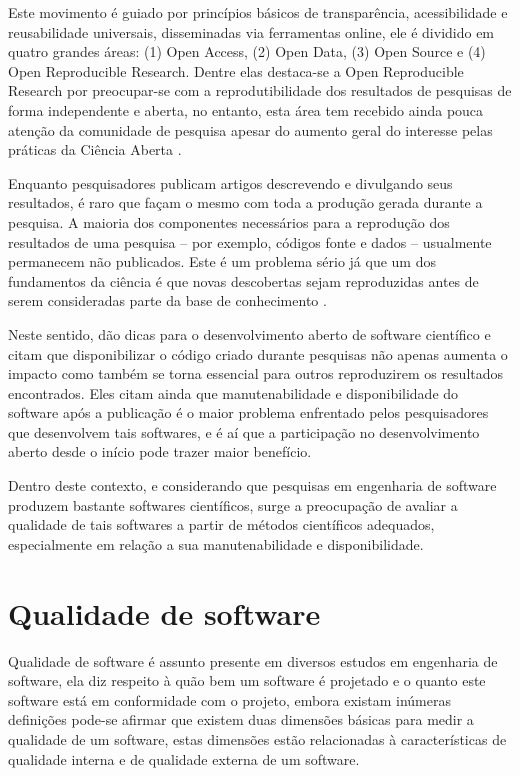 \documentclass[qual, classic, a4paper]{ufbathesis}
\begin{document}
Este movimento é guiado por princípios básicos de transparência,
acessibilidade e reusabilidade universais, disseminadas via ferramentas
online, ele é dividido em quatro grandes áreas: (1) Open Access, (2) Open
Data, (3) Open Source e (4) Open Reproducible Research. Dentre elas destaca-se
a Open Reproducible Research por preocupar-se com a reprodutibilidade dos
resultados de pesquisas de forma independente \cite{Stodden2009} e aberta, no
entanto, esta área tem recebido ainda pouca atenção da comunidade de pesquisa
\cite{Nancy2015} \cite{Grand2010Open} apesar do aumento geral do interesse
pelas práticas da Ciência Aberta \cite{Grand2010}.

Enquanto pesquisadores publicam artigos descrevendo e divulgando seus
resultados, é raro que façam o mesmo com toda a produção gerada durante a
pesquisa. A maioria dos componentes necessários para a reprodução dos
resultados de uma pesquisa -- por exemplo, códigos fonte e dados -- usualmente
permanecem não publicados. Este é um problema sério já que um dos fundamentos
da ciência é que novas descobertas sejam reproduzidas antes de serem
consideradas parte da base de conhecimento \cite{Stodden2009}.

Neste sentido,  dão dicas para o desenvolvimento aberto de software
científico e citam que disponibilizar o código criado durante pesquisas não
apenas aumenta o impacto como também se torna essencial para outros
reproduzirem os resultados encontrados. Eles citam ainda que manutenabilidade
e disponibilidade do software após a publicação é o maior problema enfrentado
pelos pesquisadores que desenvolvem tais softwares, e é aí que a
participação no desenvolvimento aberto desde o início pode trazer maior
benefício.

Dentro deste contexto, e considerando que pesquisas em engenharia de software
produzem bastante softwares científicos, surge a preocupação de avaliar a
qualidade de tais softwares a partir de métodos científicos adequados,
especialmente em relação a sua manutenabilidade e disponibilidade.

\section{Qualidade de software}

Qualidade de software é assunto presente em diversos estudos em engenharia de
software, ela diz respeito à quão bem um software é projetado e o quanto este
software está em conformidade com o projeto, embora existam inúmeras definições
\cite{Kitchenham1996} \cite{McConnell2004} \cite{Iso25022}
\cite{WikiBooksSoftwareEngineering} \cite{Staines2015} pode-se afirmar que
existem duas dimensões básicas para medir a qualidade de um software, estas
dimensões estão relacionadas à características de qualidade interna e de
qualidade externa de um software.
\end{document}
